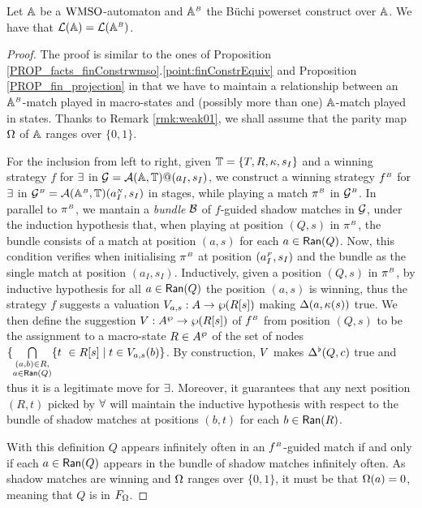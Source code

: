 \begin{proposition}
\label{p:4:2}
\label{PROP_Weak parity automata in buchinondet}
Let $\mathbb{A}$ be a $\mathrm{WMSO}$-automaton and $\mathbb{A}^{{\scriptscriptstyle B}}$ the
B\"{u}chi powerset construct over $\mathbb{A}$.
We have that
    $   \mathcal{L}( \mathbb{A}) =\mathcal{L}(\mathbb{A}^{{\scriptscriptstyle B}})$.
\end{proposition}
\begin{proof} The proof is similar to the ones of Proposition \ref{PROP_facts_finConstrwmso}.\ref{point:finConstrEquiv} and Proposition \ref{PROP_fin_projection} in that we have to maintain a relationship between an $\mathbb{A}^{{\scriptscriptstyle B}}$-match played in macro-states and (possibly more than one) $\mathbb{A}$-match played in states. Thanks to Remark \ref{rmk:weak01}, we shall assume that the parity map $\Omega$ of $\mathbb{A}$ ranges over $\{0,1\}$. 

For the inclusion from left to right, given $\mathbb{T} = \{ T,R,\kappa,s_I\}$ and a winning strategy $f$ for $\exists$ in $\mathcal{G} = \mathcal{A}(\mathbb{A},\mathbb{T})@(a_I,s_I)$, we construct a winning strategy $f^{{\scriptscriptstyle B}}$ for $\exists$ in $\mathcal{G}^{{\scriptscriptstyle B}} = \mathcal{A}(\mathbb{A}^{{\scriptscriptstyle B}},\mathbb{T})(a_I^{{\scriptscriptstyle N}},s_I)$ in stages, while playing a match $\pi^{{\scriptscriptstyle B}}$ in $\mathcal{G}^{{\scriptscriptstyle B}}$. In parallel to $\pi^{{\scriptscriptstyle B}}$, we mantain a \emph{bundle} $\mathcal{B}$ of $f$-guided shadow matches in $\mathcal{G}$, under the induction hypothesis that, when playing at position $(Q,s)$ in $\pi^{{\scriptscriptstyle B}}$, the bundle consists of a match at position $(a,s)$ for each $a \in \mathsf{Ran}(Q)$. Now, this condition verifies when initialising $\pi^{{\scriptscriptstyle B}}$ at position $(a_I^{{\scriptscriptstyle F}},s_I)$ and the bundle as the single match at position $(a_I,s_I)$. Inductively, given a position $(Q,s)$ in $\pi^{{\scriptscriptstyle B}}$, by inductive hypothesis for all $a \in \mathsf{Ran}(Q)$ the position $(a,s)$ is winning, thus the strategy $f$ suggests a valuation $V_{a,s}: A \rightarrow \wp (R[s])$ making $\Delta(a,\kappa(s))$ true. We then define the suggestion $V: A^{\wp} \rightarrow \wp (R[s])$ of $f^{{\scriptscriptstyle B}}$ from position $(Q,s)$ to be the assignment to a macro-state $R \in A^{\wp}$ of the set of nodes $\{\bigcap\limits_{\substack{(a,b) \in R,\\ a \in \mathsf{Ran}(Q)}}\{t\ \in R[s] \mid t \in V_{a,s}(b)\}$. By construction, $V$ makes $\Delta^{\flat}(Q,c)$ true and thus it is a legitimate move for $\exists$. Moreover, it guarantees that any next position $(R,t)$ picked by $\forall$ will maintain the inductive hypothesis with respect to the bundle of shadow matches at positions $(b,t)$ for each $b \in \mathsf{Ran}(R)$.

With this definition $Q$ appears infinitely often in an $f^{{\scriptscriptstyle B}}$-guided match if and only if each $a \in \mathsf{Ran}(Q)$ appears in the bundle of shadow matches infinitely often. As shadow matches are winning and $\Omega$ ranges over $\{0,1\}$, it must be that $\Omega(a) = 0$, meaning that $Q$ is in $F_{\Omega}$.


\end{proof}
